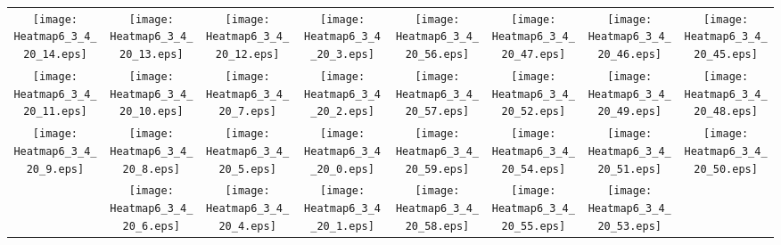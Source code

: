 \documentclass{standalone}
\begin{document}
\begin{tabular}{ *8{c} }
\texttt{[image: Heatmap6\_3\_4\_20\_14.eps]} & \texttt{[image: Heatmap6\_3\_4\_20\_13.eps]} & \texttt{[image: Heatmap6\_3\_4\_20\_12.eps]} & \texttt{[image: Heatmap6\_3\_4\_20\_3.eps]} & \texttt{[image: Heatmap6\_3\_4\_20\_56.eps]} & \texttt{[image: Heatmap6\_3\_4\_20\_47.eps]} & \texttt{[image: Heatmap6\_3\_4\_20\_46.eps]} & \texttt{[image: Heatmap6\_3\_4\_20\_45.eps]} \\
\texttt{[image: Heatmap6\_3\_4\_20\_11.eps]} & \texttt{[image: Heatmap6\_3\_4\_20\_10.eps]} & \texttt{[image: Heatmap6\_3\_4\_20\_7.eps]} & \texttt{[image: Heatmap6\_3\_4\_20\_2.eps]} & \texttt{[image: Heatmap6\_3\_4\_20\_57.eps]} & \texttt{[image: Heatmap6\_3\_4\_20\_52.eps]} & \texttt{[image: Heatmap6\_3\_4\_20\_49.eps]} & \texttt{[image: Heatmap6\_3\_4\_20\_48.eps]} \\
\texttt{[image: Heatmap6\_3\_4\_20\_9.eps]} & \texttt{[image: Heatmap6\_3\_4\_20\_8.eps]} & \texttt{[image: Heatmap6\_3\_4\_20\_5.eps]} & \texttt{[image: Heatmap6\_3\_4\_20\_0.eps]} & \texttt{[image: Heatmap6\_3\_4\_20\_59.eps]} & \texttt{[image: Heatmap6\_3\_4\_20\_54.eps]} & \texttt{[image: Heatmap6\_3\_4\_20\_51.eps]} & \texttt{[image: Heatmap6\_3\_4\_20\_50.eps]} \\
 & \texttt{[image: Heatmap6\_3\_4\_20\_6.eps]} & \texttt{[image: Heatmap6\_3\_4\_20\_4.eps]} & \texttt{[image: Heatmap6\_3\_4\_20\_1.eps]} & \texttt{[image: Heatmap6\_3\_4\_20\_58.eps]} & \texttt{[image: Heatmap6\_3\_4\_20\_55.eps]} & \texttt{[image: Heatmap6\_3\_4\_20\_53.eps]} &  
\end{tabular}
\end{document}
